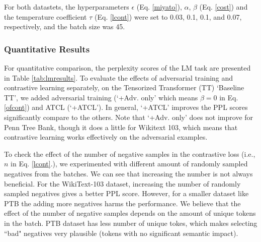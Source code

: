 \documentclass[letterpaper]{article} %
\begin{document}
For both datastets, the hyperparameters $\epsilon$ (Eq. \ref{miyato}), $\alpha$, $\beta$ (Eq. \ref{cost}) and the temperature coefficient $\tau$ (Eq. \ref{lcont}) were set to 0.03, 0.1, 0.1, and 0.07, respectively, and the batch size was 45.

\subsubsection{Quantitative Results}

For quantitative comparison, the perplexity scores of the LM task are presented in Table \ref{tab:lmresults}. To evaluate the effects of adversarial training and contrastive learning separately, on the Tensorized Transformer (TT) `Baseline TT', we added adversarial training (`+Adv. only' which means $\beta = 0$ in Eq. \ref{ofcont}) and ATCL (`+ATCL'). 
In general, `+ATCL' improves the PPL scores significantly compare to the others. Note that `+Adv. only' does not improve for Penn Tree Bank, though it does a little for Wikitext 103, which means that contrastive learning works effectively on the adversarial examples.  

To check the effect of the number of negative samples in the contrastive loss (i.e., $n$ in Eq. \ref{lcont}.), we experimented with different amount of randomly sampled negatives from the batches. 
We can see that increasing the number is not always beneficial. For the WikiText-103 dataset, increasing the number of randomly sampled negatives gives a better PPL score. However, for a smaller dataset like PTB the adding more negatives harms the performance. We believe that the effect of the number of negative samples depends on the amount of unique tokens in the batch. PTB dataset has less number of unique tokes, which makes selecting ``bad" negatives very plausible (tokens with no significant semantic impact).
\end{document}
